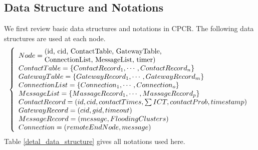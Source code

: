 \documentclass[conference]{IEEEtran}
\makeatletter
\newcommand{\tabincell}[2]{\begin{tabular}{@{}#1@{}}#2\end{tabular}}
\makeatother
\begin{document}
\subsection{Data Structure and Notations}
We first review basic data structures and notations in CPCR. The following data structures are used at each node.
 \begin{align*}
        \left\{
        \begin{array}{l}
            Node = \tabincell{l}{(id, cid, ContactTable, GatewayTable,\\ConnectionList, MessageList, timer)}\\
            ContactTable = \{ContactRecord_1,\cdots, ContactRecord_n\}\\
            GatewayTable = \{GatewayRecord_1,\cdots, GatewayRecord_m\} \\
            ConnectionList=\{Connection_1,\cdots, Connection_o\}\\
            MessageList = \{MassageRecord_1, \cdots,MassageRecord_p\}\\
            ContactRecord = (id, cid, contactTimes, \sum ICT, contactProb, timestamp)\\
            GatewayRecord = (cid, gid, timeout)\\
            MessageRecord = (message, FloodingClusters)\\
            Connection = (remoteEndNode, message)\\
        \end{array}
        \right.
    \end{align*}
Table \ref{detal_data_structure} gives all notations used here.
\end{document}

